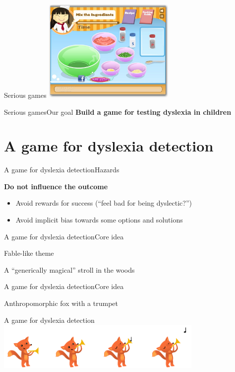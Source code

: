 \documentclass{beamer}
\begin{document}
\begin{frame}{Serious games}
\center
\includegraphics[height=5cm]{Pics/cooking_game.png}
\end{frame}

\begin{textslide}{Serious games}{Our goal}{
\textbf{Build a game for testing dyslexia in children}
}\end{textslide}

\section{A game for dyslexia detection}
\begin{slide}{A game for dyslexia detection}{Hazards}{
\item \textbf{Do not influence the outcome}
\begin{itemize}
\item Avoid rewards for success (``feel bad for being dyslectic?'')
\item Avoid implicit bias towards some options and solutions
\end{itemize}
}\end{slide}

\begin{slide}{A game for dyslexia detection}{Core idea}{
\item Fable-like theme
\item A ``generically magical'' stroll in the woods
}\end{slide}

\begin{slide}{A game for dyslexia detection}{Core idea}{
\item Anthropomorphic fox with a trumpet
}\end{slide}

\begin{frame}{A game for dyslexia detection}
\center
\includegraphics[width=10cm]{Pics/fox.png}
\end{frame}
\end{document}
